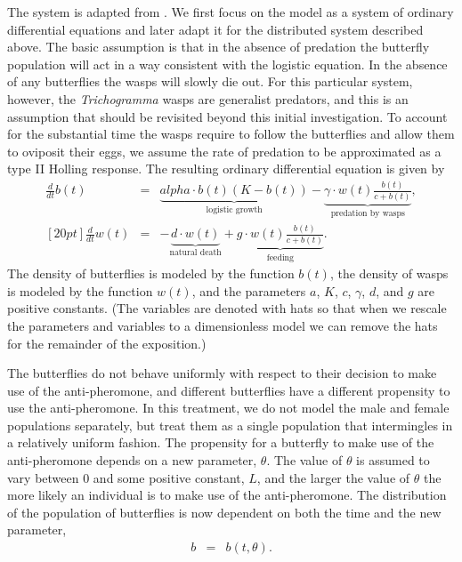 \documentclass[review,authoryear]{elsarticle}
\def\alpha{alpha}%
\newcommand{\origB}{{b}}
\newcommand{\origW}{{w}}
\newcommand{\origAlpha}{{\alpha}}
\newcommand{\origK}{{K}}
\newcommand{\origGamma}{{\gamma}}
\newcommand{\origA}{{a}}
\newcommand{\origC}{{c}}
\newcommand{\origD}{{d}}
\newcommand{\origG}{{g}}
\newcommand{\origL}{{L}}
\newcommand{\origTheta}{{\theta}}
\newcommand{\origT}{{t}}
\begin{document}
The system is adapted from \cite{TEWA20134825}. We
first focus on the model as a system of ordinary differential
equations and later adapt it for the distributed system described
above. The basic assumption is that in the absence of predation the
butterfly population will act in a way consistent with the logistic
equation. In the absence of any butterflies the wasps will slowly die
out. For this particular system, however, the \textit{Trichogramma}
wasps are generalist predators, and this is an assumption that should
be revisited beyond this initial investigation.  To account for the
substantial time the wasps require to follow the butterflies and allow
them to oviposit their eggs, we assume the rate of predation to be
approximated as a type II Holling response\citep{TEWA20134825}.  The
resulting ordinary differential equation is given by
\begin{eqnarray}
  \label{eq:initialSystem1}
  \frac{d}{d\origT} \origB(\origT) & = & \underbrace{\origAlpha \cdot \origB(\origT) (\origK - \origB(\origT))}_\text{logistic growth}
                               - \underbrace{\origGamma \cdot \origW(\origT) \frac{\origB(\origT)}{\origC+\origB(\origT)}}_\text{predation by wasps}, \\ [20pt]
  \label{eq:initialSystem2}
  \frac{d}{d\origT} \origW(\origT) & = & -\underbrace{\origD \cdot \origW(\origT)}_\text{natural death} + \underbrace{\origG \cdot \origW(\origT) \frac{\origB(\origT)}{\origC+\origB(\origT)}}_\text{feeding}.
\end{eqnarray}
The density of butterflies is modeled by the function
$\origB(\origT)$, the density of wasps is modeled by the function
$\origW(\origT)$, and the parameters $\origA$, $\origK$, $\origC$,
$\origGamma$, $\origD$, and $\origG$ are positive constants. (The variables are denoted with hats so that when we rescale the parameters and variables to a dimensionless model we can remove the hats for the remainder of the exposition.)
 
The butterflies do not behave uniformly with respect to their decision
to make use of the anti-pheromone, and different butterflies have a
different propensity to use the anti-pheromone. In this treatment, we
do not model the male and female populations separately, but treat
them as a single population that intermingles in a relatively uniform
fashion. The propensity for a butterfly to make use of the
anti-pheromone depends on a new parameter, $\origTheta$. The value of
$\origTheta$ is assumed to vary between $0$ and some positive constant,
$\origL$, and the larger the value of $\origTheta$ the more likely an
individual is to make use of the anti-pheromone. The distribution of
the population of butterflies is now dependent on both the time and
the new parameter,
\begin{eqnarray}
  \origB & = & \origB(\origT,\origTheta).
\end{eqnarray}
\end{document}
